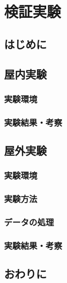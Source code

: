 \documentclass[../main]{subfiles}
\begin{document}
\chapter{検証実験}
\label{cp:verification_experiment}
\thispagestyle{empty}
\minitoc
\newpage

\section{はじめに}
\label{sec:vexp_introduction}

\clearpage

\section{屋内実験}
\label{sec:vexp_spectral-reflectance}

\subsection{実験環境}
\label{subsec:vexp_ref_environmet}

\subsection{実験結果・考察}
\label{subsec:vexp_ref_result}

\clearpage

\section{屋外実験}
\label{sec:vexp_cone-index}

\subsection{実験環境}
\label{subsec:vexp_ci_environment}

\subsection{実験方法}
\label{subsec:vexp_ci_method}

\subsection{データの処理}
\label{subsec:vexp_ci_processing}

\subsection{実験結果・考察}
\label{subsec:vexp_ci_result}

\clearpage

\section{おわりに}
\label{sec:vexp_conclusion}

\clearpage
\end{document}
